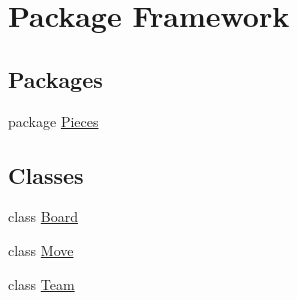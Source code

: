 \hypertarget{namespace_framework}{}\section{Package Framework}
\label{namespace_framework}
\subsection*{Packages}
\begin{DoxyCompactItemize}
\item 
package \hyperlink{namespace_framework_1_1_pieces}{Pieces}
\end{DoxyCompactItemize}
\subsection*{Classes}
\begin{DoxyCompactItemize}
\item 
class \hyperlink{class_framework_1_1_board}{Board}
\item 
class \hyperlink{class_framework_1_1_move}{Move}
\item 
class \hyperlink{class_framework_1_1_team}{Team}
\end{DoxyCompactItemize}
